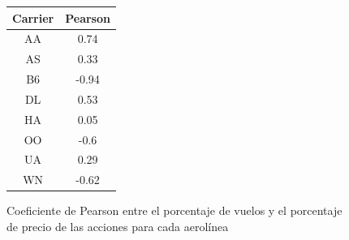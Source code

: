 \begin{figure}
\tiny
\begin{center}
  \begin{tabular}{||c || c ||}
 \hline
 Carrier & Pearson \\ [1ex]
 \hline\hline
 AA & 0.74 \\
 \hline
 AS & 0.33 \\
 \hline
 B6 & -0.94 \\
 \hline
 DL & 0.53 \\
 \hline
 HA & 0.05 \\
 \hline
 OO & -0.6 \\
 \hline
 UA & 0.29 \\
 \hline
 WN & -0.62 \\ [1ex]
 \hline
\end{tabular}
\end{center}
\caption{Coeficiente de Pearson entre el porcentaje de vuelos
y el porcentaje de precio de las acciones para cada aerol\'inea}
\label{table:pearson}
\end{figure}
